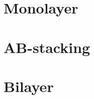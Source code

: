 \documentclass[a4paper,10pt]{report}
\begin{document}
\chapter{Monolayer}


\pagebreak

\chapter{AB-stacking}


\pagebreak

\chapter{Bilayer}


\pagebreak


%


\end{document}
